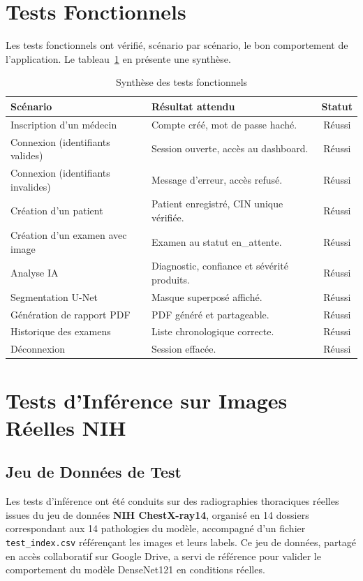 \documentclass[12pt,a4paper]{report}
\begin{document}
\section{Tests Fonctionnels}
Les tests fonctionnels ont vérifié, scénario par scénario, le bon comportement de l'application. Le tableau~\ref{tab:functests} en présente une synthèse.

\begin{table}[H]
\centering
\caption{Synthèse des tests fonctionnels}
\label{tab:functests}
\begin{tabularx}{\textwidth}{X X c}
\toprule
\textbf{Scénario} & \textbf{Résultat attendu} & \textbf{Statut} \\
\midrule
Inscription d'un médecin & Compte créé, mot de passe haché. & Réussi \\
Connexion (identifiants valides) & Session ouverte, accès au dashboard. & Réussi \\
Connexion (identifiants invalides) & Message d'erreur, accès refusé. & Réussi \\
Création d'un patient & Patient enregistré, CIN unique vérifiée. & Réussi \\
Création d'un examen avec image & Examen au statut en\_attente. & Réussi \\
Analyse IA & Diagnostic, confiance et sévérité produits. & Réussi \\
Segmentation U-Net & Masque superposé affiché. & Réussi \\
Génération de rapport PDF & PDF généré et partageable. & Réussi \\
Historique des examens & Liste chronologique correcte. & Réussi \\
Déconnexion & Session effacée. & Réussi \\
\bottomrule
\end{tabularx}
\end{table}

\section{Tests d'Inférence sur Images Réelles NIH}

\subsection{Jeu de Données de Test}
Les tests d'inférence ont été conduits sur des radiographies thoraciques réelles issues du jeu de données \textbf{NIH ChestX-ray14}, organisé en 14 dossiers correspondant aux 14 pathologies du modèle, accompagné d'un fichier \texttt{test\_index.csv} référençant les images et leurs labels. Ce jeu de données, partagé en accès collaboratif sur Google Drive, a servi de référence pour valider le comportement du modèle DenseNet121 en conditions réelles.
\end{document}
